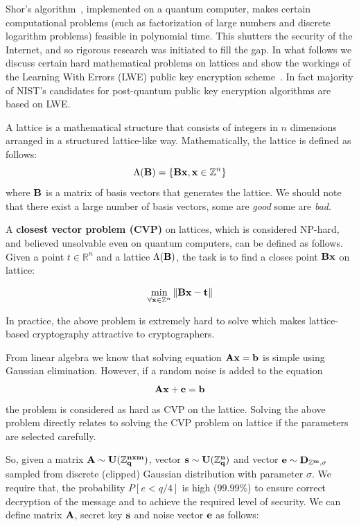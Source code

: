 Shor's algorithm~\cite{shor}, implemented on a quantum computer, makes certain computational 
problems (such as factorization of large numbers and discrete logarithm problems) 
feasible in polynomial time. This shutters the security of the Internet, and 
so rigorous research was initiated to fill the gap. In what follows we discuss
certain hard mathematical problems on lattices and show the workings of the 
Learning With Errors (LWE) public key encryption scheme~\cite{regev}. In fact majority of 
NIST's candidates for post-quantum public key encryption algorithms are based 
on LWE.

A lattice is a mathematical structure that consists of integers in $n$ dimensions 
arranged in a structured lattice-like way. Mathematically, the lattice is defined as follows:
$$\Lambda({\bf B}) = \{{\bf Bx}, {\bf x} \in \mathbb{Z}^n \}$$ where ${\bf B}$ is a matrix of basis vectors
that generates the lattice. We should note that there exist a large number of basis vectors, some are {\it good}
some are {\it bad}.

A { \bf closest vector problem (CVP) } on lattices, which is considered NP-hard, and believed unsolvable even on 
quantum computers, can be defined as follows. Given a point $t \in \mathbb{R}^n$ and a lattice
$\Lambda({\bf B})$, the task is to find a closes point ${\bf Bx}$ on lattice: 

$$\min_{\forall {\bf x} \in \mathbb{Z}^n} \|{\bf Bx} - {\bf t}\|$$ 

In practice, the above problem is extremely hard to solve which makes lattice-based cryptography 
attractive to cryptographers.

From linear algebra we know that solving equation $\bf{Ax}=\bf{b}$ is simple using
Gaussian elimination. However, if a random noise is added to the equation $$\bf{Ax} + \bf{e} = \bf{b}$$ the 
problem is considered as hard as CVP on the lattice. Solving the above problem directly relates to 
solving the CVP problem on lattice if the parameters are selected carefully.

So, given a matrix $\bf{A} \sim U(\mathbb{Z}^{nxm}_q)$, vector $\bf{s} \sim U(\mathbb{Z}^{n}_q)$ and 
vector $\bf{e} \sim D_{\mathbb{Z}^{m}, \sigma}$ sampled from discrete (clipped) Gaussian distribution with parameter $\sigma$. We require that, the probability
$P[e < q/4]$ is high (\ie $99.99\%$) to ensure correct decryption of the message and to achieve the required 
level of security. We can define matrix ${\bf A}$, secret key ${\bf s}$ and noise vector ${\bf e}$ as follows:

